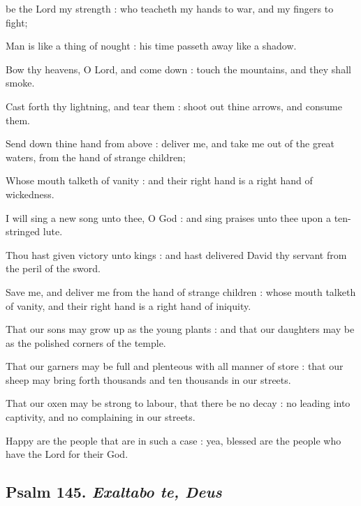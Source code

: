  be the Lord my strength : who teacheth my hands to war, and my fingers to fight;\par
{}
Man is like a thing of nought : his time passeth away like a shadow.\par
{}Bow thy heavens, O Lord, and come down : touch the mountains, and they shall smoke.\par
{}Cast forth thy lightning, and tear them : shoot out thine arrows, and consume them.\par
{}Send down thine hand from above : deliver me, and take me out of the great waters, from the hand of strange children;\par
{}Whose mouth talketh of vanity : and their right hand is a right hand of wickedness.\par
{}I will sing a new song unto thee, O God : and sing praises unto thee upon a ten-stringed lute.\par
{}Thou hast given victory unto kings : and hast delivered David thy servant from the peril of the sword.\par
{}Save me, and deliver me from the hand of strange children : whose mouth talketh of vanity, and their right hand is a right hand of iniquity.\par
{}That our sons may grow up as the young plants : and that our daughters may be as the polished corners of the temple.\par
{}That our garners may be full and plenteous with all manner of store : that our sheep may bring forth thousands and ten thousands in our streets.\par
{}That our oxen may be strong to labour, that there be no decay : no leading into captivity, and no complaining in our streets.\par
{}Happy are the people that are in such a case : yea, blessed are the people who have the Lord for their God.\par

\clearpage
\subsection{Psalm 145. \textit{Exaltabo te, Deus}}

